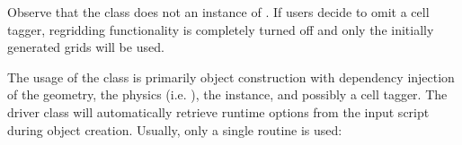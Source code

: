 \documentclass[letterpaper,10pt,english]{sphinxmanual}
\begin{document}
\begin{sphinxVerbatim}[commandchars=\\\{\},formatcom=\scriptsize]
  
                   
                       
                      
                    
\end{sphinxVerbatim}

Observe that the  class does not  an instance of {\hyperref[\detokenize{CellTagger:chap-cell-tagger}]{}}.
If users decide to omit a cell tagger, regridding functionality is completely turned off and only the initially generated grids will be used.

The usage of the  class is primarily object construction with dependency injection of the geometry, the physics (i.e. ), the  instance, and possibly a cell tagger.
The driver class will automatically retrieve run\sphinxhyphen{}time options from the input script during object creation.
Usually, only a single routine is used:

\begin{sphinxVerbatim}[commandchars=\\\{\},formatcom=\scriptsize]
 
\end{sphinxVerbatim}
\end{document}
